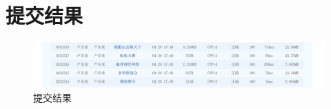 \section*{提交结果}
	\begin{figure}[htbp]
		\centering
		\includegraphics[width=1\textwidth]{result.png}
		\caption{提交结果}
	\end{figure}